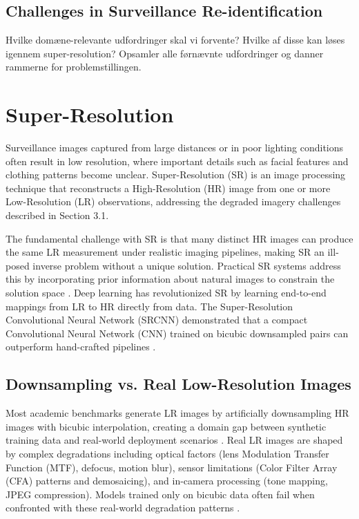 \subsection{Challenges in Surveillance Re-identification}
Hvilke domæne-relevante udfordringer skal vi forvente? Hvilke af disse kan løses igennem super-resolution? Opsamler alle førnævnte udfordringer og danner rammerne for problemstillingen. 


\section{Super-Resolution}
\label{sec:SuperResolution}

Surveillance images captured from large distances or in poor lighting conditions often result in low resolution, where important details such as facial features and clothing patterns become unclear. Super-Resolution (SR) is an image processing technique that reconstructs a High-Resolution (HR) image from one or more Low-Resolution (LR) observations, addressing the degraded imagery challenges described in Section 3.1.

The fundamental challenge with SR is that many distinct HR images can produce the same LR measurement under realistic imaging pipelines, making SR an ill-posed inverse problem without a unique solution. Practical SR systems address this by incorporating prior information about natural images to constrain the solution space \cite{Wang2019Survey,Farsiu2004Survey}. Deep learning has revolutionized SR by learning end-to-end mappings from LR to HR directly from data. The Super-Resolution Convolutional Neural Network (SRCNN) demonstrated that a compact Convolutional Neural Network (CNN) trained on bicubic downsampled pairs can outperform hand-crafted pipelines \cite{dong2015imagesuperresolutionusingdeep}.

\subsection{Downsampling vs. Real Low-Resolution Images}
\label{subsec:DownsamplingVsReal}

Most academic benchmarks generate LR images by artificially downsampling HR images with bicubic interpolation, creating a domain gap between synthetic training data and real-world deployment scenarios \cite{Agustsson2017NTIRE,Timofte2017NTIRE}. Real LR images are shaped by complex degradations including optical factors (lens Modulation Transfer Function (MTF), defocus, motion blur), sensor limitations (Color Filter Array (CFA) patterns and demosaicing), and in-camera processing (tone mapping, JPEG compression). Models trained only on bicubic data often fail when confronted with these real-world degradation patterns \cite{Cai2019RealSR,Wei2020DRealSR}.

